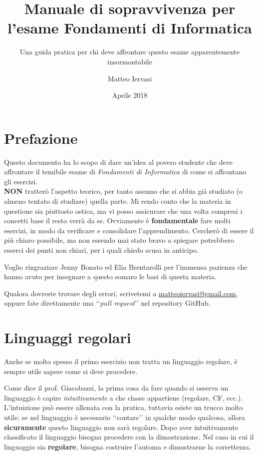 \documentclass[a4paper,oneside]{scrbook}
\title{Manuale di sopravvivenza per l'esame Fondamenti di Informatica}
\subtitle{Una guida pratica per chi deve affrontare questo esame apparentemente insormontabile}
\author{Matteo Iervasi}
\date{Aprile 2018}
\begin{document}
	
\maketitle
\tableofcontents

\chapter*{Prefazione}
Questo documento ha lo scopo di dare un'idea al povero studente che deve affrontare il temibile esame di \textit{Fondamenti di Informatica} di come si affrontano gli esercizi.\\
\textbf{{\large NON}} tratterò l'aspetto teorico, per tanto assumo che si abbia già studiato (o almeno tentato di studiare) quella parte.
Mi rendo conto che la materia in questione sia piuttosto ostica, ma vi posso assicurare che una volta compresi i concetti base il resto verrà da se.
Ovviamente è \textbf{fondamentale} fare molti esercizi, in modo da verificare e consolidare l'apprendimento. Cercherò di essere il più chiaro possibile, ma non essendo mai stato bravo
a spiegare potrebbero esserci dei punti non chiari, per i quali chiedo scusa in anticipo.

Voglio ringraziare Jenny Bonato ed Elia Brentarolli per l'immensa pazienza che hanno avuto per insegnare a questo somaro le basi di questa materia.

Qualora dovreste trovare degli errori, scrivetemi a \href{mailto:matteoiervasi@gmail.com}{matteoiervasi@gmail.com}, oppure fate direttamente una ‘‘\textit{pull request}’’ nel repository GitHub.

\chapter{Linguaggi regolari}
Anche se molto spesso il primo esercizio non tratta un linguaggio regolare, è sempre utile sapere come si deve procedere.

Come dice il prof. Giacobazzi, la prima cosa da fare quando si osserva un linguaggio è capire \textit{intuitivamente} a che classe appartiene (regolare, CF, ecc.).
L'intuizione può essere allenata con la pratica, tuttavia esiste un trucco molto utile: se nel linguaggio è necessario ‘‘contare’’ in qualche modo qualcosa, allora \textbf{sicuramente}
questo linguaggio non sarà regolare. Dopo aver intuitivamente classificato il linguaggio bisogna procedere con la dimostrazione. Nel caso in cui il linguaggio sia \textbf{regolare}, bisogna costruire l'automa e dimostrarne la correttezza.
\end{document}
